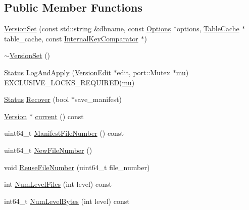 \subsection*{Public Member Functions}
\begin{DoxyCompactItemize}
\item 
\mbox{\hyperlink{classleveldb_1_1_version_set_a9e57cec002caced94f5355bb705bd52d}{Version\+Set}} (const std\+::string \&dbname, const \mbox{\hyperlink{structleveldb_1_1_options}{Options}} $\ast$options, \mbox{\hyperlink{classleveldb_1_1_table_cache}{Table\+Cache}} $\ast$table\+\_\+cache, const \mbox{\hyperlink{classleveldb_1_1_internal_key_comparator}{Internal\+Key\+Comparator}} $\ast$)
\item 
\mbox{\hyperlink{classleveldb_1_1_version_set_a53a424c5bb7699808193f150e3432e92}{$\sim$\+Version\+Set}} ()
\item 
\mbox{\hyperlink{classleveldb_1_1_status}{Status}} \mbox{\hyperlink{classleveldb_1_1_version_set_ac1d014901be7095ace1aaec0cf391fb6}{Log\+And\+Apply}} (\mbox{\hyperlink{classleveldb_1_1_version_edit}{Version\+Edit}} $\ast$edit, port\+::\+Mutex $\ast$\mbox{\hyperlink{db__impl_8cc_a740e67d0878f1b00c462da3805e85078}{mu}}) E\+X\+C\+L\+U\+S\+I\+V\+E\+\_\+\+L\+O\+C\+K\+S\+\_\+\+R\+E\+Q\+U\+I\+R\+ED(\mbox{\hyperlink{db__impl_8cc_a740e67d0878f1b00c462da3805e85078}{mu}})
\item 
\mbox{\hyperlink{classleveldb_1_1_status}{Status}} \mbox{\hyperlink{classleveldb_1_1_version_set_a456517154663338d106225cbbc254551}{Recover}} (bool $\ast$save\+\_\+manifest)
\item 
\mbox{\hyperlink{classleveldb_1_1_version}{Version}} $\ast$ \mbox{\hyperlink{classleveldb_1_1_version_set_a4e8359d3967464ca94ac007e9346f10d}{current}} () const
\item 
uint64\+\_\+t \mbox{\hyperlink{classleveldb_1_1_version_set_a208a57b4b28938ca0d8c8099d3c1f163}{Manifest\+File\+Number}} () const
\item 
uint64\+\_\+t \mbox{\hyperlink{classleveldb_1_1_version_set_ac4086c848479e74c1d9eb95e250e7167}{New\+File\+Number}} ()
\item 
void \mbox{\hyperlink{classleveldb_1_1_version_set_a8131cebf5be3283e2ce1029e8be0d14e}{Reuse\+File\+Number}} (uint64\+\_\+t file\+\_\+number)
\item 
int \mbox{\hyperlink{classleveldb_1_1_version_set_ac23afa1a53cf1f3b18319312b7681ee6}{Num\+Level\+Files}} (int level) const
\item 
int64\+\_\+t \mbox{\hyperlink{classleveldb_1_1_version_set_a02d41742ab464b83e06c7ab347db2126}{Num\+Level\+Bytes}} (int level) const

\end{DoxyCompactItemize}
